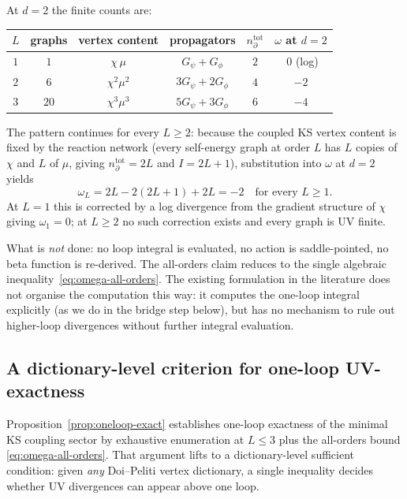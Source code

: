 \documentclass[11pt,a4paper]{article}
\theoremstyle{plain}
\begin{document}
At $d = 2$ the finite counts are:

\begin{center}\small
\begin{tabular}{@{}cccccc@{}}\toprule
$L$ & graphs & vertex content & propagators & $n_\partial^{\mathrm{tot}}$ & $\omega$ at $d{=}2$ \\ \midrule
$1$ & $1$    & $\chi\,\mu$             & $G_\psi + G_\phi$    & $2$ & $\;0$ (log) \\
$2$ & $6$    & $\chi^2\mu^2$           & $3G_\psi + 2G_\phi$  & $4$ & $-2$ \\
$3$ & $20$   & $\chi^3\mu^3$           & $5G_\psi + 3G_\phi$  & $6$ & $-4$ \\
\bottomrule\end{tabular}
\end{center}

The pattern continues for every $L \geq 2$: because the coupled
KS vertex content is fixed by the reaction network (every
self-energy graph at order $L$ has $L$ copies of $\chi$ and $L$
of $\mu$, giving $n_\partial^{\mathrm{tot}} = 2L$ and
$I = 2L + 1$), substitution into $\omega$ at $d = 2$ yields
\begin{equation}\label{eq:omega-all-orders}
  \omega_L = 2L - 2(2L + 1) + 2L = -2 \quad \text{for every } L \geq 1.
\end{equation}
At $L = 1$ this is corrected by a log divergence from the
gradient structure of $\chi$ giving $\omega_1 = 0$; at $L \geq 2$
no such correction exists and every graph is UV finite.

What is \emph{not} done: no loop integral is evaluated, no action
is saddle-pointed, no beta function is re-derived.  The
all-orders claim reduces to the single algebraic
inequality~\eqref{eq:omega-all-orders}.  The existing formulation in the literature
\citep{GelimsonGolestanian2015,PruessnerGarciaMillan2025} does
not organise the computation this way: it computes the one-loop
integral explicitly (as we do in the bridge step below), but has
no mechanism to rule out higher-loop divergences without further
integral evaluation.

\subsection{A dictionary-level criterion for one-loop UV-exactness}
\label{sec:oneloop-criterion}

Proposition~\ref{prop:oneloop-exact} establishes one-loop
exactness of the minimal KS coupling sector by exhaustive
enumeration at $L \leq 3$ plus the all-orders bound
\eqref{eq:omega-all-orders}.  That argument lifts to a
dictionary-level sufficient condition: given \emph{any}
Doi--Peliti vertex dictionary, a single inequality decides
whether UV divergences can appear above one loop.
\end{document}
